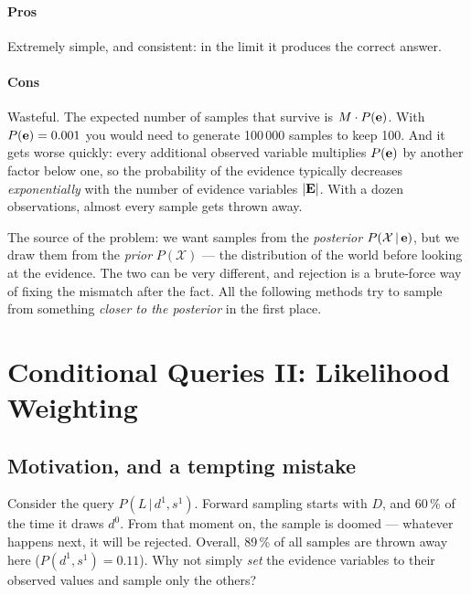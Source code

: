 \documentclass[11pt, oneside]{book}
\newcommand{\Prob}{\mathbb{P}}           %
\newcommand{\given}{\,\vert\,}           %
\newcommand{\Xall}{\mathcal{X}}          %
\let\originalsection\section
\renewcommand{\section}{\Needspace{7\baselineskip}\originalsection}
\let\originalsubsection\subsection
\renewcommand{\subsection}{\Needspace{6\baselineskip}\originalsubsection}
\begin{document}
\paragraph{Pros} Extremely simple, and consistent: in the limit it produces
the correct answer.

\paragraph{Cons} Wasteful. The expected number of samples that survive is
$M \cdot P(\mathbf{e})$. With $P(\mathbf{e}) = 0.001$ you would need to generate 100\,000
samples to keep 100. And it gets worse quickly: every additional observed
variable multiplies $P(\mathbf{e})$ by another factor below one, so the probability
of the evidence typically decreases \emph{exponentially} with the number of
evidence variables $|\mathbf{E}|$. With a dozen observations, almost every sample
gets thrown away.

\begin{intbox}[unbreakable]
The source of the problem: we want samples from the \emph{posterior}
$P(\Xall \given \be)$, but we draw them from the \emph{prior} $P(\Xall)$ --- the
distribution of the world before looking at the evidence. The two can be very
different, and rejection is a brute-force way of fixing the mismatch after
the fact. All the following methods try to sample from something
\emph{closer to the posterior} in the first place.
\end{intbox}

\section{Conditional Queries II: Likelihood Weighting}
\label{sec:lw}

\subsection{Motivation, and a tempting mistake}

Consider the query $P(L \given d^1, s^1)$. Forward sampling starts with $D$,
and 60\,\% of the time it draws $d^0$. From that moment on, the sample is
doomed --- whatever happens next, it will be rejected. Overall, 89\,\% of all
samples are thrown away here ($P(d^1, s^1) = 0.11$). Why not simply
\emph{set} the evidence variables to their observed values and sample only the
others?
\end{document}
